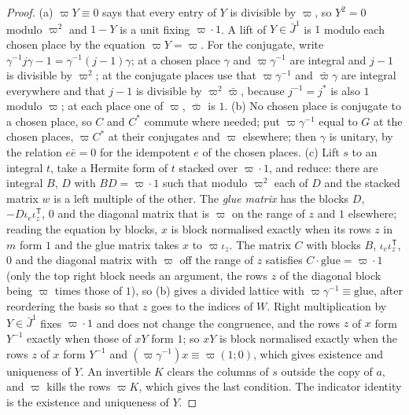 \begin{proof}
(a) $\varpi Y\equiv0$ says that every entry of $Y$ is divisible by $\varpi$, so $Y^2=0$ modulo $\varpi^2$ and $1-Y$ is a unit fixing $\varpi\cdot1$. A lift of $Y\in\bar J^1$ is $1$ modulo each chosen place by the equation $\varpi Y=\varpi$. For the conjugate, write
$\gamma^{-1}j\gamma-1=\gamma^{-1}(j-1)\gamma$; at a chosen place $\gamma$ and $\varpi\gamma^{-1}$ are integral and $j-1$ is divisible by $\varpi^2$; at the conjugate places use that $\varpi\gamma^{-1}$ and $\bar\varpi\gamma$ are integral everywhere and that $j-1$ is divisible
by $\varpi^2\bar\varpi$, because $j^{-1}=j^*$ is also $1$ modulo $\varpi$; at each place one of $\varpi$, $\bar\varpi$ is $1$. (b) No chosen place is conjugate to a chosen place, so $C$ and $C^*$ commute where needed; put $\varpi\gamma^{-1}$ equal to $G$ at the chosen places,
$\varpi C^*$ at their conjugates and $\varpi$ elsewhere; then $\gamma$ is unitary, by the relation $e\bar e=0$ for the idempotent $e$ of the chosen places. (c) Lift $s$ to an integral $t$, take a Hermite form of $t$ stacked over $\varpi\cdot1$, and reduce:
there are integral $B$, $D$ with $BD=\varpi\cdot1$ such that modulo $\varpi^2$ each of $D$ and the stacked matrix $w$ is a left multiple of the other. The \emph{glue matrix} has the blocks $D$, $-D\iota_e\iota_z^{\mathsf T}$, $0$ and the diagonal matrix that is $\varpi$ on
the range of $z$ and $1$ elsewhere; reading the equation by blocks, $x$ is block normalised exactly when its rows $z$ in $m$ form $1$ and the glue matrix takes $x$ to $\varpi\iota_{z}$. The matrix $C$ with blocks $B$, $\iota_e\iota_z^{\mathsf T}$, $0$ and the diagonal
matrix with $\varpi$ off the range of $z$ satisfies $C\cdot\mathrm{glue}=\varpi\cdot1$ (only the top right block needs an argument, the rows $z$ of the diagonal block being $\varpi$ times those of $1$), so (b) gives a divided lattice with
$\varpi\gamma^{-1}\equiv\mathrm{glue}$, after reordering the basis so that $z$ goes to the indices of $W$. Right multiplication by $Y\in\bar J^1$ fixes $\varpi\cdot1$ and does not change the congruence, and the rows $z$ of $x$ form $Y^{-1}$ exactly when those of $xY$ form
$1$; so $xY$ is block normalised exactly when the rows $z$ of $x$ form $Y^{-1}$ and $(\varpi\gamma^{-1})x\equiv\varpi(1;0)$, which gives existence and uniqueness of $Y$. An invertible $K$ clears the columns of $s$ outside the copy of $a$, and $\varpi$ kills the rows
$\varpi K$, which gives the last condition. The indicator identity is the existence and uniqueness of $Y$.
\end{proof}

